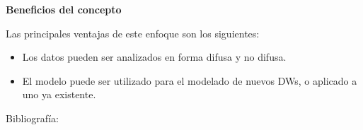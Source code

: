 \documentclass{fancyslides}
\begin{document}
\begin{frame}
\misc
{
\textbf{Beneficios del concepto}
\newline

Las principales ventajas de este enfoque son los siguientes:
\begin{itemize}
  \item Los datos pueden ser analizados en forma difusa y no difusa.
  \item El modelo puede ser utilizado para el modelado de nuevos DWs, o aplicado a uno ya existente.
\end{itemize}
}
\end{frame}


\begin{frame}
\misc
{ Bibliografía:

\printbibliography
}
\end{frame}
\end{document}
